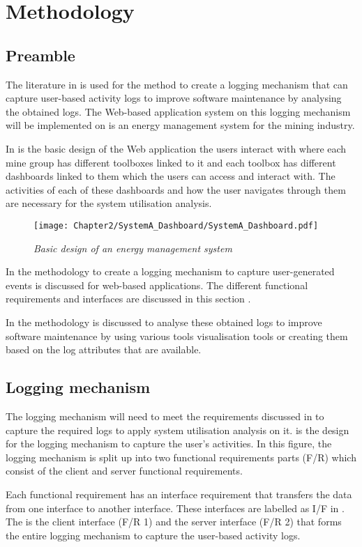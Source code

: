 \chapter{Methodology}
\label{chap:2}

\section{Preamble} The literature in  is used for the method to create a logging mechanism that can capture user-based activity logs to improve software maintenance by analysing the obtained logs. The Web-based application system on this logging mechanism will be implemented on is an energy management system for the mining industry.\par In  is the basic design of the Web application the users interact with where each mine group has different toolboxes linked to it and each toolbox has different dashboards linked to them which the users can access and interact with. The activities of each of these dashboards and how the user navigates through them are necessary for the system utilisation analysis.

\begin{figure}[!htb] %
	\centering %
	\texttt{[image: Chapter2/SystemA\_Dashboard/SystemA\_Dashboard.pdf]}
	\caption[Basic design of an energy management system]
	{\textit{Basic design of an energy management system}}\label{fig:ch2_webSystemBasic}
\end{figure}

In  the methodology to create a logging mechanism to capture user-generated events is discussed for web-based applications. The different functional requirements and interfaces are discussed in this section \cite{Anish2015}.\par In  the methodology is discussed to analyse these obtained logs to improve software maintenance by using various tools visualisation tools or creating them based on the log attributes that are available.

\section{Logging mechanism}\label{Ch2:LoggingMechanism} The logging mechanism will need to meet the requirements discussed in  to capture the required logs to apply system utilisation analysis on it.  is the design for the logging mechanism to capture the user's activities. In this figure, the logging mechanism is split up into two functional requirements parts (F/R) which consist of the client and server functional requirements.\par Each functional requirement has an interface requirement that transfers the data from one interface to another interface. These interfaces are labelled as I/F in . The  is the client interface (F/R 1) and the server interface (F/R 2) that forms the entire logging mechanism to capture the user-based activity logs.

